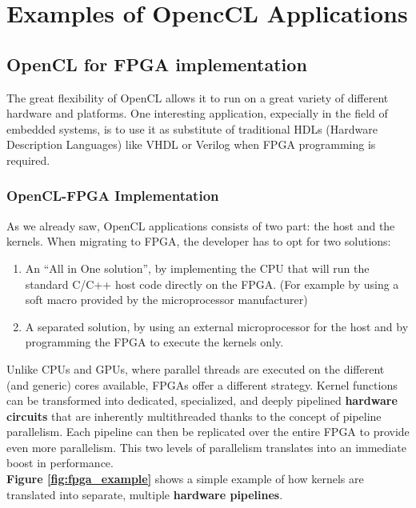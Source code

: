 
\section{Examples of OpencCL Applications}


\subsection{OpenCL for FPGA implementation}
The great flexibility of OpenCL allows it to run on a great variety of different hardware and platforms. One interesting application, expecially in the field of embedded systems, is to use it as substitute of traditional HDLs (Hardware Description Languages) like VHDL or Verilog when FPGA programming is required.

\subsubsection{OpenCL-FPGA Implementation}
As we already saw, OpenCL applications consists of two part: the host and the kernels.
When migrating to FPGA, the developer has to opt for two solutions:

\begin{enumerate}
	\item An ``All in One solution'', by implementing the CPU that will run the standard C/C++ host code directly on the FPGA. (For example by using a soft macro provided by the microprocessor manufacturer)
	\item A separated solution, by using an external microprocessor for the host and by programming the FPGA to execute the kernels only.
	\end{enumerate}
	
Unlike CPUs and GPUs, where parallel threads are executed on the different (and generic) cores available, FPGAs offer a different strategy. Kernel functions can be transformed into dedicated, specialized, and deeply pipelined \textbf{hardware circuits} that are inherently multithreaded thanks to the concept of pipeline parallelism. Each pipeline can then be replicated over the entire FPGA to provide even more parallelism. This two levels of parallelism translates into an immediate boost in performance.\\
\textbf{Figure \ref {fig:fpga_example}} shows a simple example of how kernels are translated into separate, multiple \textbf{hardware pipelines}.
	
